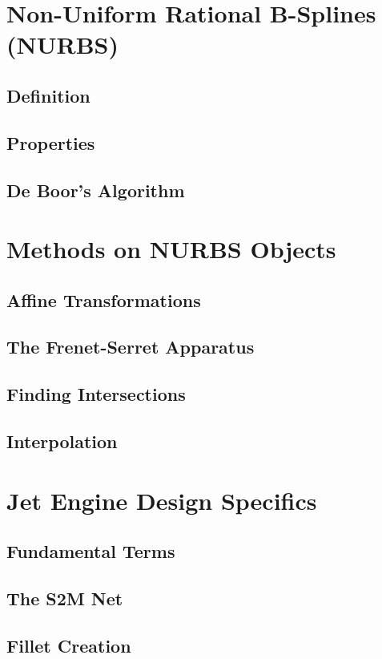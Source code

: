 \documentclass[a4paper, 11pt]{report}
\theoremstyle{definition}
\begin{document}
\section{Non-Uniform Rational B-Splines (NURBS)}
\subsection{Definition}
\subsection{Properties}
\subsection{De Boor's Algorithm}

\section{Methods on NURBS Objects}
\subsection{Affine Transformations}
\subsection{The Frenet-Serret Apparatus}
\subsection{Finding Intersections}
\subsection{Interpolation}

\section{Jet Engine Design Specifics}
\subsection{Fundamental Terms}
\subsection{The S2M Net}
\subsection{Fillet Creation}
\end{document}
